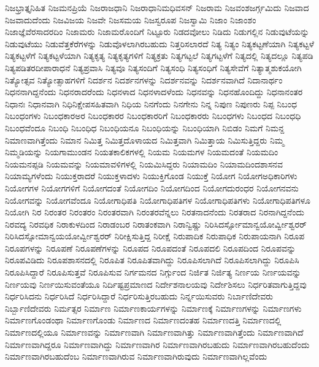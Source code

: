 {ನಿಜಭ್ರಾತ್ತೃನಿಹಿತ
ನಿಜಮನಪ್ರಿಯೆ
ನಿಜರಾಜಧಾನಿ
ನಿಜರಾಧಾನಿಮಧಿವಸನ್
ನಿಜರಾಮ
ನಿಜವಂಶಜರ್ಗ್ಗಮಿದು
ನಿಜವಾದ
ನಿಜವಾದುದೆಂದು
ನಿಜವಿಜಯ
ನಿಜವೇ
ನಿಜಸಮಯ
ನಿಜಸ್ವರೂಪ
ನಿಜಸ್ವಾಮಿ
ನಿಜಾಂ
ನಿಜಾಂಶಂ
ನಿಜಾಜ್ಞೆವೆರಸಾದರದಿಂ
ನಿಜಾಮರು
ನಿಜಾಮರೊಂದಿಗೆ
ನಿಟ್ಟೂರು
ನಿಡದವೋಲು
ನಿಡಿದು
ನಿಡುಗಲ್ಲಿನ
ನಿಡುವುಟೆಯನ್ನು
ನಿಡುವುಟೆಯು
ನಿಡುವೆತ್ತಕೆರೆಗಳನ್ನು
ನಿಡುವೊಳಲಾಗಿರಬಹುದು
ನಿತ್ತರಿಸಲಾರದೆ
ನಿತ್ಯ
ನಿತ್ಯಂ
ನಿತ್ಯಕಟ್ಟಣೆಯಾಗಿ
ನಿತ್ಯಕಟ್ಟಳೆ
ನಿತ್ಯಕಟ್ಟಳೆಗೆ
ನಿತ್ಯಕಟ್ಟಳೆಯಾಗಿ
ನಿತ್ಯಕೃತ್ಯ
ನಿತ್ಯಕೃತ್ಯಗಳಿಗೆ
ನಿತ್ಯಕ್ರತು
ನಿತ್ಯಗಟ್ಟಲೆ
ನಿತ್ಯಗಟ್ಟಳೆಗೆ
ನಿತ್ಯದಲ್ಲಿ
ನಿತ್ಯದಲ್ಲೂ
ನಿತ್ಯಪಡಿ
ನಿತ್ಯಪಡಿತರದೀಪಾರಾಧನೆ
ನಿತ್ಯಪ್ರವಾಸಿ
ನಿತ್ಯವೂ
ನಿತ್ಯಸಂದಿಗೆ
ನಿತ್ಯಸಂಧಿ
ನಿತ್ಯಸಂಧಿಗೆ
ನಿತ್ಯಸೇವೆಗೆ
ನಿತ್ಯಾತ್ಮಶುಕಯೋಗಿ
ನಿತ್ಯೋತ್ಸವ
ನಿತ್ಯೋತ್ಸಾಹಗಳಿಗೆ
ನಿದರ್ಶನ
ನಿದರ್ಶನಗಳನ್ನು
ನಿದರ್ಶನವನ್ನು
ನಿದರ್ಶನವಾಗಿದೆ
ನಿದಾನಾರ್ಥಂ
ನಿಧನನಾಗಿದ್ದನೆಂದು
ನಿಧನರಾದರೆಂದು
ನಿಧನಳಾದ
ನಿಧನಳಾದಳೆಂದು
ನಿಧನವನ್ನು
ನಿಧನಹೊಂದಿದ್ದು
ನಿಧನಾನಂತರ
ನಿಧಾನಃ
ನಿಧಾನವಾಗಿ
ನಿಧಿನಿಕ್ಷೇಪಸಹಿತವಾಗಿ
ನಿಧಿಯ
ನಿನಗೆಂದು
ನಿನಗೇನು
ನಿನ್ನ
ನಿಪುಣ
ನಿಪುಣರು
ನಿಪ್ಪ
ನಿಬಂಧ
ನಿಬಂಧಂಗಳು
ನಿಬಂಧಕಾರಅರ
ನಿಬಂಧಕಾರರ
ನಿಬಂಧಕಾರರಿಗೆ
ನಿಬಂಧಕಾರರು
ನಿಬಂಧಗಳು
ನಿಬಂಧದ
ನಿಬಂಧಧಿ
ನಿಬಂಧವೆಂದೂ
ನಿಬಂಧಿ
ನಿಬಂಧಿಧ
ನಿಬಂಧಿಯನೂ
ನಿಬಂಧಿಯನ್ನು
ನಿಬಂಧಿಯಾಗಿ
ನಿಬಿಡಂ
ನಿಮಗೆ
ನಿಮನ್ದ
ನಿಮಾಣವಾಗಿತ್ತೆಂದು
ನಿಮಾನ
ನಿಮಿತ್ತ
ನಿಮಿತ್ತದೊಳಾಯದ
ನಿಮಿತ್ತವಾಗಿ
ನಿಮಿತ್ತಾಯ
ನಿಮಿಸುತ್ತಿದ್ದರು
ನಿಮ್ಮ
ನಿಮ್ಮಡಿಯನ್ನು
ನಿಯಗಾಮುಂಡನ
ನಿಯತಕಾಲಿಕಗಳಲ್ಲಿ
ನಿಯಮ
ನಿಯಮಗಳ
ನಿಯಮದಂತೆ
ನಿಯಮದಿಂ
ನಿಯಮನಪ್ಪಡಿ
ನಿಯಮವನ್ನು
ನಿಯಮಾವಳಿಗಳಲ್ಲಿ
ನಿಯಮಿಸಿದ್ದರು
ನಿಯಾಮದಿಂ
ನಿಯಾಮದಿಂದಶಾಸನವ
ನಿಯಾಮ್ಯಗಳೆಂದು
ನಿಯುಕ್ತರಾದರೆ
ನಿಯುಕ್ತಳಾದಳು
ನಿಯುಕ್ತಿಗೊಂಡ
ನಿಯುಕ್ತೆ
ನಿಯೋಗ
ನಿಯೋಗಅಧಿಕಾರಿಗಳು
ನಿಯೋಗಗಳ
ನಿಯೋಗಗಳಿಗೆ
ನಿಯೋಗದಂತೆ
ನಿಯೋಗದಿಂ
ನಿಯೋಗದಿಂದ
ನಿಯೋಗದುರಂಧರ
ನಿಯೋಗನವನು
ನಿಯೋಗವನ್ನು
ನಿಯೋಗವೆಂದೂ
ನಿಯೋಗಾಧಿಪತಿ
ನಿಯೋಗಾಧಿಪತಿಗಳ
ನಿಯೋಗಾಧಿಪತಿಗಳು
ನಿಯೋಗಾಧಿಪತಿಗಳೂ
ನಿಯೋಗಿ
ನಿರ
ನಿರಂತರ
ನಿರಂತರಂ
ನಿರಂತರವಾಗಿ
ನಿರಂತರವೆನ್ನಲು
ನಿರತನಾದನೆಂದು
ನಿರತರಾದ
ನಿರನಾಗಿದ್ದನೆಂದು
ನಿರವದ್ಯ
ನಿರವಧಿಕ
ನಿರಾಕುಳದಿಂದ
ನಿರಾಡಂಬರ
ನಿರಾತಂಕವಾಗಿ
ನಿರಾನ್ವಿಷ್ಣು
ನಿರಿಸಿದರ್ಸ್ಸೋಮಾನ್ವಯೋರ್ವ್ವೀಶ್ವರರ್
ನಿರಿಸಿದಸ್ಸೋಮಾನ್ವಯಯೋರ್ವ್ವೀಶ್ವರರ್
ನಿರೀಕ್ಷಿಸುತ್ತಿದ್ದ
ನಿರೀಕ್ಷೆ
ನಿರುಪಾದಿಕ
ನಿರುಪಾಧಿಕ
ನಿರುಪಾಯನಾಗಿ
ನಿರೂಪ
ನಿರೂಪಗಳನ್ನು
ನಿರೂಪಣೆ
ನಿರೂಪಣೆಗಳನ್ನು
ನಿರೂಪದ
ನಿರೂಪದಂತೆ
ನಿರೂಪದಲಿ
ನಿರೂಪದಿಂದ
ನಿರೂಪವನ್ನು
ನಿರೂಪವಿಡಿದು
ನಿರೂಪಶಾಸನದಲ್ಲಿ
ನಿರೂಪಿತ
ನಿರೂಪಿತವಾಗಿದ್ದು
ನಿರೂಪಿಸಲಾಗಿದೆ
ನಿರೂಪಿಸಲಾಗಿದ್ದು
ನಿರೂಪಿಸಿ
ನಿರೂಪಿಸಿದ್ದಾರೆ
ನಿರೂಪಿಸುತ್ತವೆ
ನಿರೂಪಿಸುವ
ನಿರ್ಗಮನದ
ನಿರ್ಗ್ಗುಂದ
ನಿರ್ಜಿತ
ನಿರ್ಜಿತ್ಯ
ನಿರ್ಣಯ
ನಿರ್ಣಯವನ್ನು
ನಿರ್ಣಯವು
ನಿರ್ಣಯಿಸುವಂತೆಯೂ
ನಿರ್ದಿಷ್ಟಪ್ರಮಾಣದ
ನಿರ್ದೇಶನಾಲಯವು
ನಿರ್ದೇಶಿಸಲು
ನಿರ್ಧರಿತವಾಗುತ್ತಿದ್ದವು
ನಿರ್ಧರಿಸಿದನು
ನಿರ್ಧರಿಸಿದೆ
ನಿರ್ಧರಿಸಿದ್ದಾರೆ
ನಿರ್ಧರಿಸುತ್ತಿರಬಹುದು
ನಿರ್ನ್ನಯಿಸುವರು
ನಿರ್ಬಾಣಿದೇವರು
ನಿರ್ಬ್ಬಾಣಿದೇವರು
ನಿರ್ಮತ್ಸರ
ನಿರ್ಮಾಣ
ನಿರ್ಮಾಣಕಾರ್ಯಗಳನ್ನು
ನಿರ್ಮಾಣಕ್ಕೆ
ನಿರ್ಮಾಣಗಳನ್ನು
ನಿರ್ಮಾಣಗಳು
ನಿರ್ಮಾಣಗೊಂಡಂಥಾ
ನಿರ್ಮಾಣಗೊಂಡು
ನಿರ್ಮಾಣದ
ನಿರ್ಮಾಣದಂತಹ
ನಿರ್ಮಾಣದತ್ತಿ
ನಿರ್ಮಾಣದಲ್ಲಿ
ನಿರ್ಮಾಣದಲ್ಲಿಯೂ
ನಿರ್ಮಾಣವನ್ನು
ನಿರ್ಮಾಣವಾಗಿ
ನಿರ್ಮಾಣವಾಗಿತ್ತು
ನಿರ್ಮಾಣವಾಗಿತ್ತೆಂದು
ನಿರ್ಮಾಣವಾಗಿದೆ
ನಿರ್ಮಾಣವಾಗಿದ್ದರೂ
ನಿರ್ಮಾಣವಾಗಿದ್ದು
ನಿರ್ಮಾಣವಾಗಿರ
ನಿರ್ಮಾಣವಾಗಿರಬಹುದು
ನಿರ್ಮಾಣವಾಗಿರಬಹುದೆಂದು
ನಿರ್ಮಾಣವಾಗಿರಬಹುದೆಂಬ
ನಿರ್ಮಾಣವಾಗಿರುವ
ನಿರ್ಮಾಣವಾಗಿರುವುದು
ನಿರ್ಮಾಣವಾಗಿಲ್ಲವೆಂದು
}

